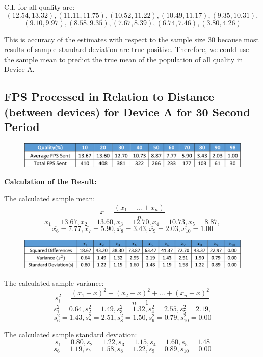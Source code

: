 \documentclass[a4paper,12pt]{article}
\begin{document}
\begin{appendices}
C.I. for all quality are:
$$(12.54,13.32),(11.11,11.75),(10.52,11.22),(10.49,11.17),(9.35,10.31),$$
$$(9.10,9.97),(8.58,9.35),(7.67,8.39),(6.74,7.46),(3.80,4.26)$$

This is accuracy of the estimates with respect to the sample size 30 because most results of sample standard deviation are true positive. Therefore, we could use the sample mean to predict the true mean of the population of all quality in Device A.



\newpage
\subsection{FPS Processed in Relation to Distance (between devices) for Device A for 30 Second Period}\label{App:ErrorDistance}

\begin{figure}[h!]
\centering
\includegraphics[scale=.9]{StatisticalTest/Distance1.png}
\end{figure}

\textbf{Calculation of the Result:}

The calculated sample mean:
$$\overline{x}=\frac{(x_1+...+x_n)}{n}$$
$$\overline{x_1}=13.67,\overline{x_2}=13.60,\overline{x_3}=12.70,\overline{x_4}=10.73,\overline{x_5}=8.87,$$
$$\overline{x_6}=7.77,\overline{x_7}=5.90,\overline{x_8}=3.43,\overline{x_9}=2.03,\overline{x_{10}}=1.00$$

\begin{figure}[h!]
\centering
\includegraphics[scale=.9]{StatisticalTest/Distance2.png}
\end{figure}

The calculated sample variance:
$$s_i^2=\frac{(x_1-\overline{x})^2+(x_2-\overline{x})^2+...+(x_n-\overline{x})^2}{n-1}$$
$$s_1^2=0.64,s_2^2=1.49,s_3^2=1.32,s_4^2=2.55,s_5^2=2.19, $$
$$s_6^2=1.43,s_7^2=2.51,s_8^2=1.50,s_9^2=0.79,s_{10}^2= 0.00$$

The calculated sample standard deviation:
$$s_1=0.80,s_2=1.22,s_3=1.15,s_4=1.60,s_5=1.48$$
$$s_6=1.19,s_7=1.58,s_8=1.22,s_9=0.89,s_10=0.00$$


\end{appendices}
\end{document}
